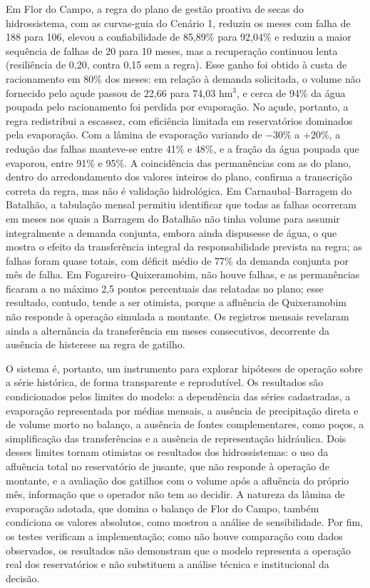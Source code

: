 Em Flor do Campo, a regra do plano de gestão proativa de secas do hidrossistema, com as curvas-guia do Cenário 1, reduziu os meses com falha de 188 para 106, elevou a confiabilidade de 85,89\% para 92,04\% e reduziu a maior sequência de falhas de 20 para 10 meses, mas a recuperação continuou lenta (resiliência de 0,20, contra 0,15 sem a regra). Esse ganho foi obtido à custa de racionamento em 80\% dos meses: em relação à demanda solicitada, o volume não fornecido pelo açude passou de 22,66 para 74,03 hm$^3$, e cerca de 94\% da água poupada pelo racionamento foi perdida por evaporação. No açude, portanto, a regra redistribui a escassez, com eficiência limitada em reservatórios dominados pela evaporação. Com a lâmina de evaporação variando de $-30$\% a $+20$\%, a redução das falhas manteve-se entre 41\% e 48\%, e a fração da água poupada que evaporou, entre 91\% e 95\%. A coincidência das permanências com as do plano, dentro do arredondamento dos valores inteiros do plano, confirma a transcrição correta da regra, mas não é validação hidrológica. Em Carnaubal--Barragem do Batalhão, a tabulação mensal permitiu identificar que todas as falhas ocorreram em meses nos quais a Barragem do Batalhão não tinha volume para assumir integralmente a demanda conjunta, embora ainda dispusesse de água, o que mostra o efeito da transferência integral da responsabilidade prevista na regra; as falhas foram quase totais, com déficit médio de 77\% da demanda conjunta por mês de falha. Em Fogareiro--Quixeramobim, não houve falhas, e as permanências ficaram a no máximo 2,5 pontos percentuais das relatadas no plano; esse resultado, contudo, tende a ser otimista, porque a afluência de Quixeramobim não responde à operação simulada a montante. Os registros mensais revelaram ainda a alternância da transferência em meses consecutivos, decorrente da ausência de histerese na regra de gatilho.

O sistema é, portanto, um instrumento para explorar hipóteses de operação sobre a série histórica, de forma transparente e reprodutível. Os resultados são condicionados pelos limites do modelo: a dependência das séries cadastradas, a evaporação representada por médias mensais, a ausência de precipitação direta e de volume morto no balanço, a ausência de fontes complementares, como poços, a simplificação das transferências e a ausência de representação hidráulica. Dois desses limites tornam otimistas os resultados dos hidrossistemas: o uso da afluência total no reservatório de jusante, que não responde à operação de montante, e a avaliação dos gatilhos com o volume após a afluência do próprio mês, informação que o operador não tem ao decidir. A natureza da lâmina de evaporação adotada, que domina o balanço de Flor do Campo, também condiciona os valores absolutos, como mostrou a análise de sensibilidade. Por fim, os testes verificam a implementação; como não houve comparação com dados observados, os resultados não demonstram que o modelo representa a operação real dos reservatórios e não substituem a análise técnica e institucional da decisão.

